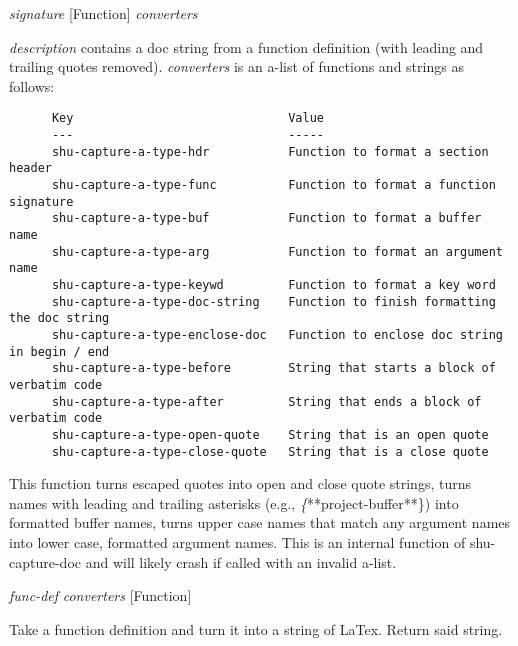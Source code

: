\vspace{1em}
\noindent
{}
\usebox{\funcname}\emph{signature}
 \hfill [Function]
\hspace*{\wd\funcname}\emph{converters}

\begin{doc-string}
\emph{description} contains a doc string from a function definition (with leading
and trailing quotes removed).  \emph{converters} is an a-list of functions and strings as
follows:

\begin{verbatim}
      Key                              Value
      ---                              -----
      shu-capture-a-type-hdr           Function to format a section header
      shu-capture-a-type-func          Function to format a function signature
      shu-capture-a-type-buf           Function to format a buffer name
      shu-capture-a-type-arg           Function to format an argument name
      shu-capture-a-type-keywd         Function to format a key word
      shu-capture-a-type-doc-string    Function to finish formatting the doc string
      shu-capture-a-type-enclose-doc   Function to enclose doc string in begin / end
      shu-capture-a-type-before        String that starts a block of verbatim code
      shu-capture-a-type-after         String that ends a block of verbatim code
      shu-capture-a-type-open-quote    String that is an open quote
      shu-capture-a-type-close-quote   String that is a close quote
\end{verbatim}

This function turns escaped quotes into open and close quote strings, turns names
with leading and trailing asterisks (e.g., \emph\{**project-buffer**\}) into formatted buffer
names, turns upper case names that match any argument names into lower case,
formatted argument names.  This is an internal function of shu-capture-doc and
will likely crash if called with an invalid a-list.
\end{doc-string}

\vspace{1em}
\noindent
{}
\usebox{\funcname}\emph{func-def} \emph{converters}
 \hfill [Function]
\hspace*{\wd\funcname}

\begin{doc-string}
Take a function definition and turn it into a string of LaTex.  Return said string.
\end{doc-string}

